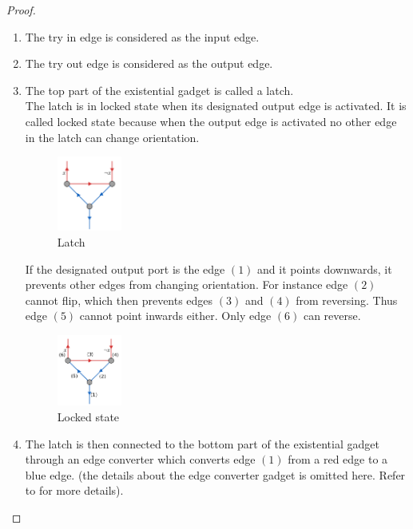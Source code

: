 \begin{proof}
\begin{enumerate}
    \begin{enumerate}
        \item The try in edge is considered as the input edge.
        \item The try out edge is considered as the output edge. 
        \item The top part of the existential gadget is called a latch. \\
        The latch is in locked state when its designated output edge is activated. It is called locked state because when the output edge is activated no other edge in the latch can change orientation.
        
        \begin{figure}[H]
        \centering
        \includegraphics[width=0.2\textwidth]{res/existential2.pdf}
        \caption{Latch}
        \label{fig:circle}
        \end{figure}

        \begin{example}
        If the designated output port is the edge $(1)$ and it points downwards, it prevents other edges from changing orientation. For instance edge $(2)$ cannot flip, which then prevents edges $(3)$ and $(4)$ from reversing. Thus edge $(5)$ cannot point inwards either. Only edge $(6)$ can reverse. 
        
        \begin{figure}[H]
        \centering
        \includegraphics[width=0.2\textwidth]{res/existential3.pdf}
        \caption{Locked state}
        \label{fig:existential3}
        \end{figure}
        \end{example}
        
        \item The latch is then connected to the bottom part of the existential gadget through an edge converter which converts edge $(1)$ from a red edge to a blue edge. (the details about the edge converter gadget is omitted here. Refer to \cite{goos_nondeterministic_2002} for more details). \\
        

\end{enumerate}
\end{enumerate}
\end{proof}
